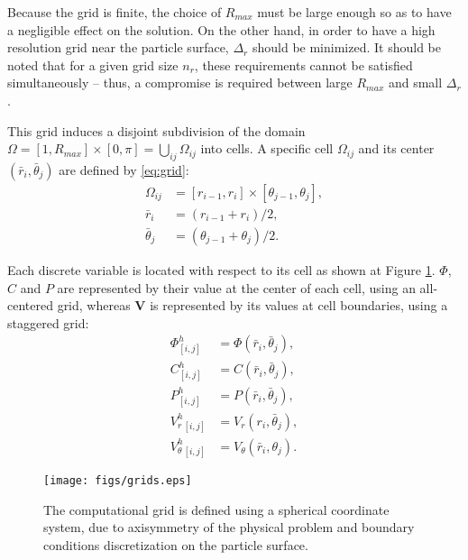 \documentclass[MSc,beforeExam]{iitcsthesis}
\newcommand\bV{\boldsymbol{V}}
\begin{document}
Because the grid is finite, the choice of $R_{max}$ must be large enough 
so as to have a negligible effect on the solution. 
On the other hand, in order to have a high resolution grid near the particle surface,
$\Delta_r$ should be minimized. It should be noted that for a given grid size $n_r$,
these requirements cannot be satisfied simultaneously -- thus, a compromise is required
between large $R_{max}$ and small $\Delta_r$.

This grid induces a disjoint subdivision of the domain 
$\Omega = [1, R_{max}] \times [0,\pi] = \bigcup_{ij}\Omega_{ij}$ into cells.
A specific cell $\Omega_{ij}$ and its center $(\bar{r}_i, \bar{\theta}_j)$ are defined by \eqref{eq:grid}:
\begin{align}
\nonumber
\Omega_{ij} &= [r_{i-1}, r_{i}] \times [\theta_{j-1}, \theta_{j}], \\
\bar{r}_i &= (r_{i-1} + r_{i})/2, \\
\nonumber
\bar{\theta}_j &= (\theta_{j-1} + \theta_{j})/2.
\end{align}

Each discrete variable is located with respect to its cell 
as shown at Figure \ref{fig:grids}.
$\varPhi$, $C$ and $P$ are represented by their value at the center of each cell, 
using an all-centered grid, whereas $\bV$ is represented by its values at cell 
boundaries, using a staggered grid:
\begin{align}
\nonumber \varPhi^h_{[i,j]} &= \varPhi(\bar{r}_i, \bar{\theta}_j), \\
\nonumber C^h_{[i,j]} &= C(\bar{r}_i, \bar{\theta}_j), \\
P^h_{[i,j]} &= P(\bar{r}_i, \bar{\theta}_j), \\
\nonumber V_r^h{}_{[i,j]} &= V_r(r_i, \bar{\theta}_j), \\
\nonumber V_\theta^h{}_{[i,j]} &= V_\theta(\bar{r}_i, {\theta}_j).
\end{align}
\begin{figure}[p]
    \begin{center}
	\texttt{[image: figs/grids.eps]}
        \caption[Computational grid]{The computational grid is defined using
        a spherical coordinate system, due to axisymmetry of the physical problem
        and boundary conditions discretization on the particle surface.}
    \label{fig:grids}
    \end{center}
\end{figure}
\end{document}
